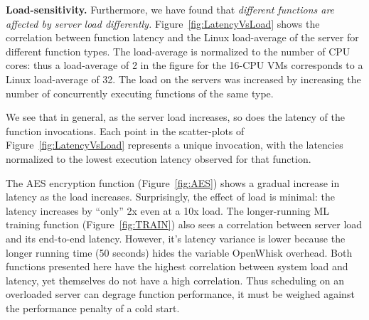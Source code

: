 

\noindent \textbf{Load-sensitivity.} 
Furthermore, we have found that \emph{different functions are affected by server load differently.}
%
Figure~\ref{fig:LatencyVsLoad} shows the correlation between function latency and the Linux load-average of the server for different function types. 
The load-average is normalized to the number of CPU cores: thus a load-average of 2 in the figure for the 16-CPU VMs corresponds to a Linux load-average of 32.
The load on the servers was increased by increasing the number of concurrently executing functions of the same type.


We see that in general, as the server load increases, so does the latency of the function invocations.
Each point in the scatter-plots of Figure~\ref{fig:LatencyVsLoad} represents a unique invocation, with the latencies normalized to the lowest execution latency observed for that function.

The AES encryption function (Figure~\ref{fig:AES}) shows a gradual increase in latency as the load increases.
Surprisingly, the effect of load is minimal: the latency increases by ``only'' 2x even at a 10x load. 
The longer-running ML training function (Figure~\ref{fig:TRAIN}) also sees a correlation between server load and its end-to-end latency.
However, it's latency variance is lower because the longer running time (50 seconds) hides the variable OpenWhisk overhead.
Both functions presented here have the highest correlation between system load and latency, yet themselves do not have a high correlation.
Thus scheduling on an overloaded server can degrage function performance, it must be weighed against the performance penalty of a cold start.

